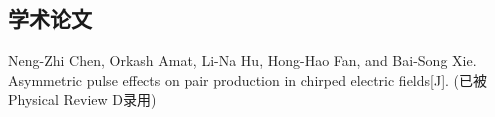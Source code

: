 
\begin{resume}

  \section*{学术论文}

\begin{achievements} 
\item Neng-Zhi Chen, Orkash Amat, Li-Na Hu, Hong-Hao Fan, and Bai-Song Xie. Asymmetric pulse effects on pair production in chirped electric fields[J]. (已被Physical Review D录用) 
\end{achievements}


\end{resume}
